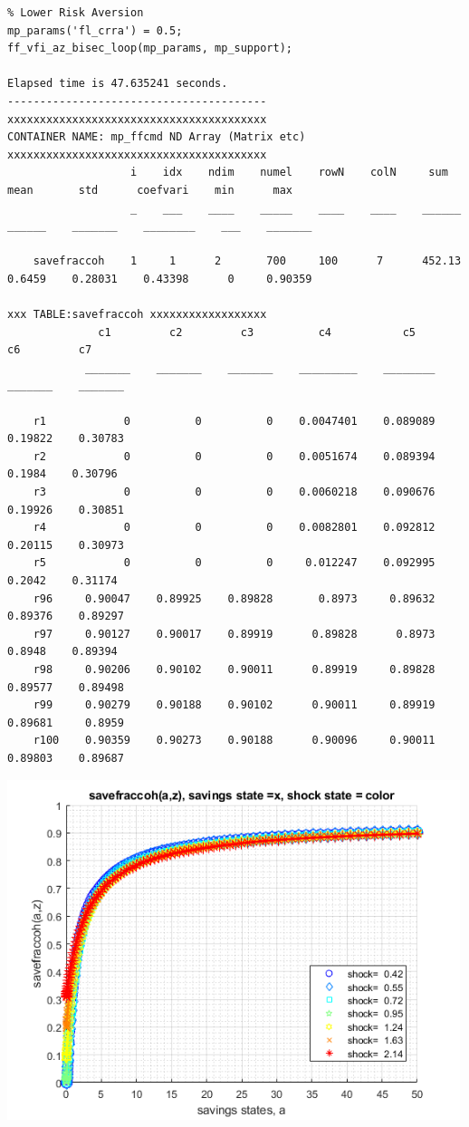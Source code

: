 \documentclass[
]{book}
\begin{document}
\begin{verbatim}
% Lower Risk Aversion
mp_params('fl_crra') = 0.5;
ff_vfi_az_bisec_loop(mp_params, mp_support);

Elapsed time is 47.635241 seconds.
----------------------------------------
xxxxxxxxxxxxxxxxxxxxxxxxxxxxxxxxxxxxxxxx
CONTAINER NAME: mp_ffcmd ND Array (Matrix etc)
xxxxxxxxxxxxxxxxxxxxxxxxxxxxxxxxxxxxxxxx
                   i    idx    ndim    numel    rowN    colN     sum       mean       std      coefvari    min      max  
                   _    ___    ____    _____    ____    ____    ______    ______    _______    ________    ___    _______

    savefraccoh    1     1      2       700     100      7      452.13    0.6459    0.28031    0.43398      0     0.90359

xxx TABLE:savefraccoh xxxxxxxxxxxxxxxxxx
              c1         c2         c3          c4           c5         c6         c7   
            _______    _______    _______    _________    ________    _______    _______

    r1            0          0          0    0.0047401    0.089089    0.19822    0.30783
    r2            0          0          0    0.0051674    0.089394     0.1984    0.30796
    r3            0          0          0    0.0060218    0.090676    0.19926    0.30851
    r4            0          0          0    0.0082801    0.092812    0.20115    0.30973
    r5            0          0          0     0.012247    0.092995     0.2042    0.31174
    r96     0.90047    0.89925    0.89828       0.8973     0.89632    0.89376    0.89297
    r97     0.90127    0.90017    0.89919      0.89828      0.8973     0.8948    0.89394
    r98     0.90206    0.90102    0.90011      0.89919     0.89828    0.89577    0.89498
    r99     0.90279    0.90188    0.90102      0.90011     0.89919    0.89681     0.8959
    r100    0.90359    0.90273    0.90188      0.90096     0.90011    0.89803    0.89687
\end{verbatim}

\includegraphics[width=5.20833in,height=\textheight]{img/fx_vfi_az_bisec_loop_images/figure_2.png}
\end{document}
